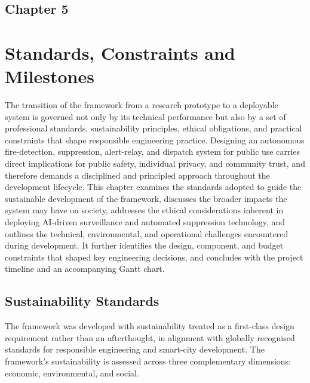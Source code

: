 \begin{center}
    \section*{\fontsize{20}{20}\selectfont Chapter 5}
\end{center}
\vspace{10mm}

\section{Standards, Constraints and Milestones}

The transition of the framework from a research prototype to a deployable system is governed not only by its technical performance but also by a set of professional standards, sustainability principles, ethical obligations, and practical constraints that shape responsible engineering practice. Designing an autonomous fire-detection, suppression, alert-relay, and dispatch system for public use carries direct implications for public safety, individual privacy, and community trust, and therefore demands a disciplined and principled approach throughout the development lifecycle. This chapter examines the standards adopted to guide the sustainable development of the framework, discusses the broader impacts the system may have on society, addresses the ethical considerations inherent in deploying AI-driven surveillance and automated suppression technology, and outlines the technical, environmental, and operational challenges encountered during development. It further identifies the design, component, and budget constraints that shaped key engineering decisions, and concludes with the project timeline and an accompanying Gantt chart.

\subsection{Sustainability Standards}

The framework was developed with sustainability treated as a first-class design requirement rather than an afterthought, in alignment with globally recognised standards for responsible engineering and smart-city development. The framework's sustainability is assessed across three complementary dimensions: economic, environmental, and social.

